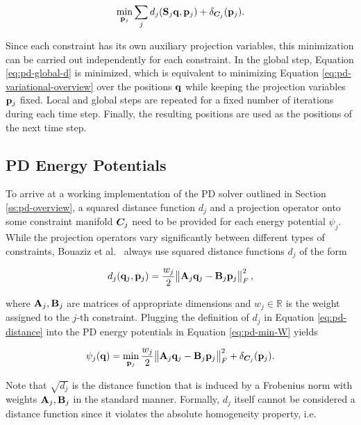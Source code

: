 \begin{equation}\label{eq:pd-local-d}
    \min_{\mathbf{p}_j} \sum_j d_j(\mathbf{S}_j \mathbf{q}, \mathbf{p}_j) + \delta_{\bm{C}_j}(\mathbf{p}_j).
\end{equation}

\noindent Since each constraint has its own auxiliary projection variables, this minimization can be carried out independently 
for each constraint. In the global step, Equation \ref{eq:pd-global-d} is minimized, which is equivalent to minimizing 
Equation \ref{eq:pd-variational-overview} over the positions $\mathbf{q}$ while keeping the projection variables $\mathbf{p}_j$ 
fixed. Local and global steps are repeated for a fixed number of iterations during each time step. Finally, the 
resulting positions are used as the positions of the next time step.

\subsection{PD Energy Potentials}\label{ss:pd-potentials}
To arrive at a working implementation of the PD solver outlined in Section \ref{ss:pd-overview}, a squared distance function 
$d_j$ and a projection operator onto some constraint manifold $\bm{C}_j$ need to be provided for each energy potential $\psi_j$. 
While the projection operators vary significantly between different types of constraints, Bouaziz et al.\ \cite{bouaziz2014} 
always use squared distance functions $d_j$ of the form

\begin{equation}\label{eq:pd-distance}
    d_j(\mathbf{q}_j, \mathbf{p}_j) = \frac{w_j}{2} \norm{\mathbf{A}_j\mathbf{q}_j - \mathbf{B}_j\mathbf{p}_j}^2_F,
\end{equation}

\noindent where $\mathbf{A}_j, \mathbf{B}_j$ are matrices of appropriate dimensions and $w_j \in \mathbb{R}$ is the weight assigned to the
$j$-th constraint. Plugging the definition of $d_j$ in Equation \ref{eq:pd-distance} into the PD energy potentials in Equation \ref{eq:pd-min-W} 
yields

\begin{equation}\label{eq:pd-potentials}
    \psi_j(\mathbf{q}) = \min_{\mathbf{p}_j} \frac{w_j}{2} \norm{\mathbf{A}_j\mathbf{q}_j - \mathbf{B}_j\mathbf{p}_j}^2_F + \delta_{\bm{C}_j}(\mathbf{p}_j).
\end{equation}

Note that $\sqrt{d_j}$ is the distance function that is induced by a Frobenius norm with weights $\mathbf{A}_j, 
\mathbf{B}_j$ in the standard manner. Formally, $d_j$ itself cannot be considered a distance function since it violates the absolute
homogeneity property, i.e. 

